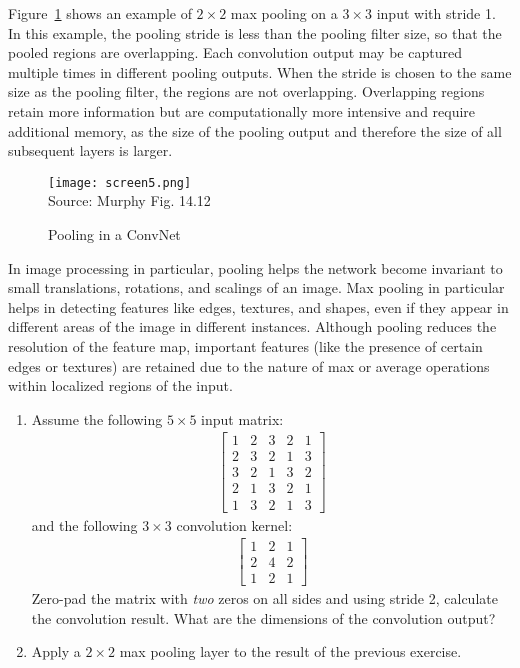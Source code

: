 Figure~\ref{fig:screen5_chap16} shows an example of $2 \times 2$ max pooling on a $3 \times 3$ input with stride 1. In this example, the pooling stride is less than the pooling filter size, so that the pooled regions are overlapping. Each convolution output may be captured multiple times in different pooling outputs. When the stride is chosen to the same size as the pooling filter, the regions are not overlapping. Overlapping regions retain more information but are computationally more intensive and require additional memory, as the size of the pooling output and therefore the size of all subsequent layers is larger. 

\begin{figure}
\centering
\texttt{[image: screen5.png]} \\

\scriptsize Source: Murphy Fig. 14.12
\caption{Pooling in a ConvNet}
\label{fig:screen5_chap16}
\end{figure}

In image processing in particular, pooling helps the network become invariant to small translations, rotations, and scalings of an image. Max pooling in particular helps in detecting features like edges, textures, and shapes, even if they appear in different areas of the image in different instances. Although pooling reduces the resolution of the feature map, important features (like the presence of certain edges or textures) are retained due to the nature of max or average operations within localized regions of the input.

\begin{exercisebox}

\begin{enumerate}
\item Assume the following $5 \times 5$ input matrix:
\begin{align*}
\begin{bmatrix} 1 & 2 & 3 & 2 & 1 \\ 
                2 & 3 & 2 & 1 & 3 \\ 
                3 & 2 & 1 & 3 & 2 \\
                2 & 1 & 3 & 2 & 1 \\               
                1 & 3 & 2 & 1 & 3 
\end{bmatrix}
\end{align*}
and the following $3 \times 3$ convolution kernel:
\begin{align*}
\begin{bmatrix}  1 & 2 & 1 \\ 
                2 & 4 & 2 \\
                1 & 2 & 1 \end{bmatrix}
\end{align*}
Zero-pad the matrix with \emph{two} zeros on all sides and using stride 2, calculate the convolution result. What are the dimensions of the convolution output?

\item Apply a $2 \times 2$ max pooling layer to the result of the previous exercise. 
\end{enumerate}
\end{exercisebox}


